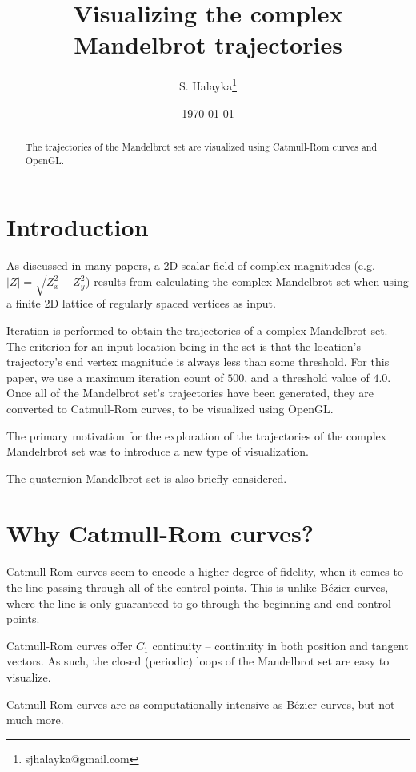 \documentclass[12pt]{article}
\title{Visualizing the complex Mandelbrot trajectories}
\author{S. Halayka\footnote{sjhalayka@gmail.com}}
\date{\today}
\begin{document}
\maketitle

\begin{abstract}
The trajectories of the Mandelbrot set are visualized using Catmull-Rom curves and OpenGL.
\end{abstract}



\section{Introduction}

As discussed in many papers, a 2D scalar field of complex magnitudes (e.g. $|Z| = \sqrt{Z_x^2 + Z_y^2}$) results from calculating the complex Mandelbrot set when using a finite 2D lattice of regularly spaced vertices as input.

Iteration is performed to obtain the trajectories of a complex Mandelbrot set.
The criterion for an input location being in the set is that the location's trajectory's end vertex magnitude is always less than some threshold.
For this paper, we use a maximum iteration count of $500$, and a threshold value of $4.0$.
Once all of the Mandelbrot set's trajectories have been generated, they are converted to Catmull-Rom curves, to be visualized using OpenGL. 

The primary motivation for the exploration of the trajectories of the complex Mandelrbrot set was to introduce a new type of visualization.

The quaternion Mandelbrot set is also briefly considered.


\section{Why Catmull-Rom curves?}

Catmull-Rom curves seem to encode a higher degree of fidelity, when it comes to the line passing through all of the control points.
This is unlike B\'ezier curves, where the line is only guaranteed to go through the beginning and end control points.

Catmull-Rom curves offer $C_1$ continuity -- continuity in both position and tangent vectors.
As such, the closed (periodic) loops of the Mandelbrot set are easy to visualize.

Catmull-Rom curves are as computationally intensive as B\'ezier curves, but not much more.
\end{document}
